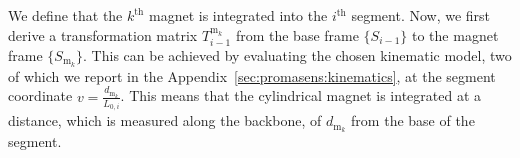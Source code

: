 We define that the $k^\mathrm{th}$ magnet is integrated into the $i^\mathrm{th}$ segment. Now, we first derive a transformation matrix $T_{i-1}^{\mathrm{m}_k}$ from the base frame $\{S_{i-1}\}$ to the magnet frame $\{ S_{\mathrm{m}_k} \}$. 
This can be achieved by evaluating the chosen kinematic model, two of which we report in the Appendix~\ref{sec:promasens:kinematics}, at the segment coordinate $v = \frac{d_{\mathrm{m}_k}}{L_{0,i}}$. 
This means that the cylindrical magnet is integrated at a distance, which is measured along the backbone, of $d_{\mathrm{m}_k}$ from the base of the segment.


